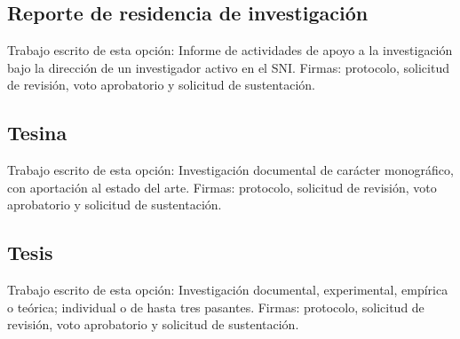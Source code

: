 \subsection{Reporte de residencia de investigación}
Trabajo escrito de esta opción: Informe de actividades de apoyo a la investigación bajo la dirección de un investigador activo en el SNI. Firmas: protocolo, solicitud de revisión, voto aprobatorio y solicitud de sustentación.
\subsection{Tesina}
Trabajo escrito de esta opción: Investigación documental de carácter monográfico, con aportación al estado del arte. Firmas: protocolo, solicitud de revisión, voto aprobatorio y solicitud de sustentación.
\subsection{Tesis}
Trabajo escrito de esta opción: Investigación documental, experimental, empírica o teórica; individual o de hasta tres pasantes. Firmas: protocolo, solicitud de revisión, voto aprobatorio y solicitud de sustentación.
